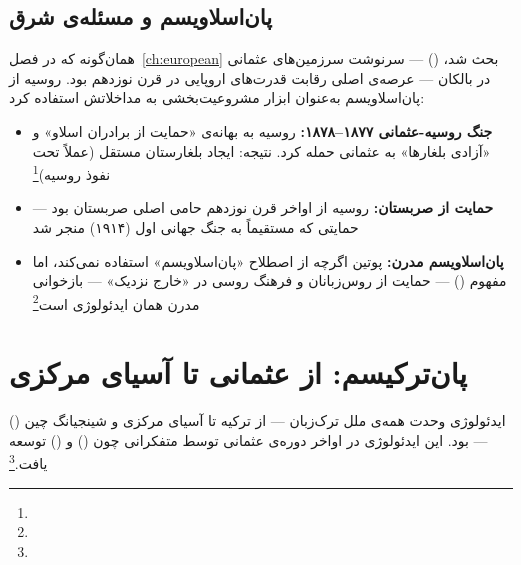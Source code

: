 \subsection{پان‌اسلاویسم و مسئله‌ی شرق}
\label{subsec:ch13-panslavism-eastern}

همان‌گونه که در فصل~\ref{ch:european} بحث شد،  () — سرنوشت سرزمین‌های عثمانی در بالکان — عرصه‌ی اصلی رقابت قدرت‌های اروپایی در قرن نوزدهم بود. روسیه از پان‌اسلاویسم به‌عنوان ابزار مشروعیت‌بخشی به مداخلاتش استفاده کرد:

\begin{tcolorbox}[casebox, title={پان‌اسلاویسم به‌مثابه‌ی ابزار مداخله}]
\begin{itemize}
\item \textbf{جنگ روسیه-عثمانی ۱۸۷۷–۱۸۷۸:} روسیه به بهانه‌ی «حمایت از برادران اسلاو» و «آزادی بلغارها» به عثمانی حمله کرد. نتیجه: ایجاد بلغارستان مستقل (عملاً تحت نفوذ روسیه)\footnote{}
\item \textbf{حمایت از صربستان:} روسیه از اواخر قرن نوزدهم حامی اصلی صربستان بود — حمایتی که مستقیماً به جنگ جهانی اول (۱۹۱۴) منجر شد
\item \textbf{پان‌اسلاویسم مدرن:} پوتین اگرچه از اصطلاح «پان‌اسلاویسم» استفاده نمی‌کند، اما مفهوم  () — حمایت از روس‌زبانان و فرهنگ روسی در «خارج نزدیک» — بازخوانی مدرن همان ایدئولوژی است\footnote{}
\end{itemize}
\end{tcolorbox}


\section{پان‌ترکیسم: از عثمانی تا آسیای مرکزی}
\label{sec:ch13-panturkism}

 () ایدئولوژی وحدت همه‌ی ملل ترک‌زبان — از ترکیه تا آسیای مرکزی و شینجیانگ چین — بود. این ایدئولوژی در اواخر دوره‌ی عثمانی توسط متفکرانی چون  () و  () توسعه یافت.\footnote{}

